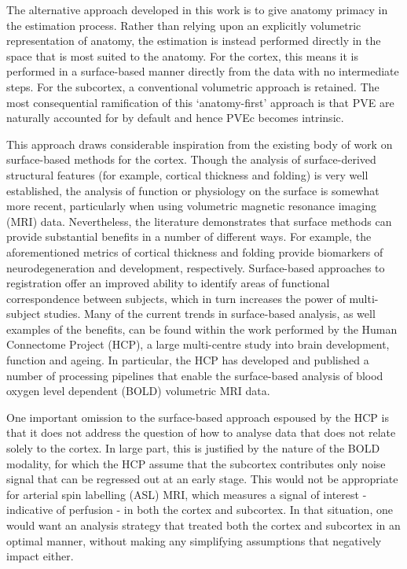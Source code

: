 The alternative approach developed in this work is to give anatomy primacy in the estimation process. Rather than relying upon an explicitly volumetric representation of anatomy, the estimation is instead performed directly in the space that is most suited to the anatomy. For the cortex, this means it is performed in a surface-based manner directly from the data with no intermediate steps. For the subcortex, a conventional volumetric approach is retained. The most consequential ramification of this `anatomy-first' approach is that PVE are naturally accounted for by default and hence PVEc becomes intrinsic.  

This approach draws considerable inspiration from the existing body of work on surface-based methods for the cortex. Though the analysis of surface-derived structural features (for example, cortical thickness and folding) is very well established, the analysis of function or physiology on the surface is somewhat more recent, particularly when using volumetric magnetic resonance imaging (MRI) data. Nevertheless, the literature demonstrates that surface methods can provide substantial benefits in a number of different ways. For example, the aforementioned metrics of cortical thickness and folding provide biomarkers of neurodegeneration and development, respectively. Surface-based approaches to registration offer an improved ability to identify areas of functional correspondence between subjects, which in turn increases the power of multi-subject studies. Many of the current trends in surface-based analysis, as well examples of the benefits, can be found within the work performed by the Human Connectome Project (HCP), a large multi-centre study into brain development, function and ageing. In particular, the HCP has developed and published a number of processing pipelines that enable the surface-based analysis of blood oxygen level dependent (BOLD) volumetric MRI data. 

One important omission to the surface-based approach espoused by the HCP is that it does not address the question of how to analyse data that does not relate solely to the cortex. In large part, this is justified by the nature of the BOLD modality, for which the HCP assume that the subcortex contributes only noise signal that can be regressed out at an early stage. This would not be appropriate for arterial spin labelling (ASL) MRI, which measures a signal of interest - indicative of perfusion - in both the cortex and subcortex. In that situation, one would want an analysis strategy that treated both the cortex and subcortex in an optimal manner, without making any simplifying assumptions that negatively impact either. 

